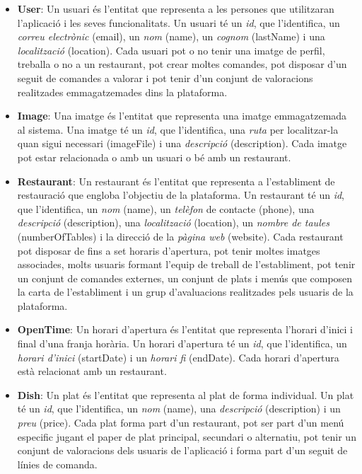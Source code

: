 \begin{itemize}
\item \textbf{User}: Un usuari és l'entitat que representa a les persones que utilitzaran l'aplicació i les seves funcionalitats. Un usuari té un \textit{id}, que l'identifica, un \textit{correu electrònic} (email), un \textit{nom} (name), un \textit{cognom} (lastName) i una \textit{localització} (location). Cada usuari pot o no tenir una imatge de perfil, treballa o no a un restaurant, pot crear moltes comandes, pot disposar d'un seguit de comandes a valorar i pot tenir d'un conjunt de valoracions realitzades emmagatzemades dins la plataforma.

\item \textbf{Image}: Una imatge és l'entitat que representa una imatge emmagatzemada al sistema. Una imatge té un \textit{id}, que l'identifica, una \textit{ruta} per localitzar-la quan sigui necessari (imageFile) i una \textit{descripció} (description). Cada imatge pot estar relacionada o amb un usuari o bé amb un restaurant.

\item \textbf{Restaurant}: Un restaurant és l'entitat que representa a l'establiment de restauració que engloba l'objectiu de la plataforma. Un restaurant té un \textit{id}, que l'identifica, un \textit{nom} (name), un \textit{telèfon} de contacte (phone), una \textit{descripció} (description), una \textit{localització} (location), un \textit{nombre de taules} (numberOfTables) i la direcció de la \textit{pàgina web} (website). Cada restaurant pot disposar de fins a set horaris d'apertura, pot tenir moltes imatges associades, molts usuaris formant l'equip de treball de l'establiment, pot tenir un conjunt de comandes externes, un conjunt de plats i menús que composen la carta de l'establiment i un grup d'avaluacions realitzades pels usuaris de la plataforma.

\item \textbf{OpenTime}: Un horari d'apertura és l'entitat que representa l'horari d'inici i final d'una franja horària. Un horari d'apertura té un \textit{id}, que l'identifica, un \textit{horari d'inici} (startDate) i un \textit{horari fi} (endDate). Cada horari d'apertura està relacionat amb un restaurant.

\item \textbf{Dish}: Un plat és l'entitat que representa al plat de forma individual. Un plat té un \textit{id}, que l'identifica, un \textit{nom} (name), una \textit{descripció} (description) i un \textit{preu} (price). Cada plat forma part d'un restaurant, pot ser part d'un menú especific jugant el paper de plat principal, secundari o alternatiu, pot tenir un conjunt de valoracions dels usuaris de l'aplicació i forma part d'un seguit de línies de comanda.


\end{itemize}
